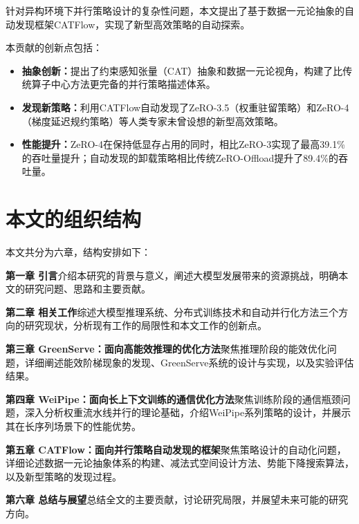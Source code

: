 针对异构环境下并行策略设计的复杂性问题，本文提出了基于数据一元论抽象的自动发现框架CATFlow，实现了新型高效策略的自动探索。

本贡献的创新点包括：
\begin{itemize}
    \item \textbf{抽象创新：}提出了约束感知张量（CAT）抽象和数据一元论视角，构建了比传统算子中心方法更完备的并行策略描述体系。
    \item \textbf{发现新策略：}利用CATFlow自动发现了ZeRO-3.5（权重驻留策略）和ZeRO-4（梯度延迟规约策略）等人类专家未曾设想的新型高效策略。
    \item \textbf{性能提升：}ZeRO-4在保持低显存占用的同时，相比ZeRO-3实现了最高39.1\%的吞吐量提升；自动发现的卸载策略相比传统ZeRO-Offload提升了89.4\%的吞吐量。
\end{itemize}

\section{本文的组织结构}

本文共分为六章，结构安排如下：

\textbf{第一章 引言}介绍本研究的背景与意义，阐述大模型发展带来的资源挑战，明确本文的研究问题、思路和主要贡献。

\textbf{第二章 相关工作}综述大模型推理系统、分布式训练技术和自动并行化方法三个方向的研究现状，分析现有工作的局限性和本文工作的创新点。

\textbf{第三章 GreenServe：面向高能效推理的优化方法}聚焦推理阶段的能效优化问题，详细阐述能效阶梯现象的发现、GreenServe系统的设计与实现，以及实验评估结果。

\textbf{第四章 WeiPipe：面向长上下文训练的通信优化方法}聚焦训练阶段的通信瓶颈问题，深入分析权重流水线并行的理论基础，介绍WeiPipe系列策略的设计，并展示其在长序列场景下的性能优势。

\textbf{第五章 CATFlow：面向并行策略自动发现的框架}聚焦策略设计的自动化问题，详细论述数据一元论抽象体系的构建、减法式空间设计方法、势能下降搜索算法，以及新型策略的发现过程。

\textbf{第六章 总结与展望}总结全文的主要贡献，讨论研究局限，并展望未来可能的研究方向。
